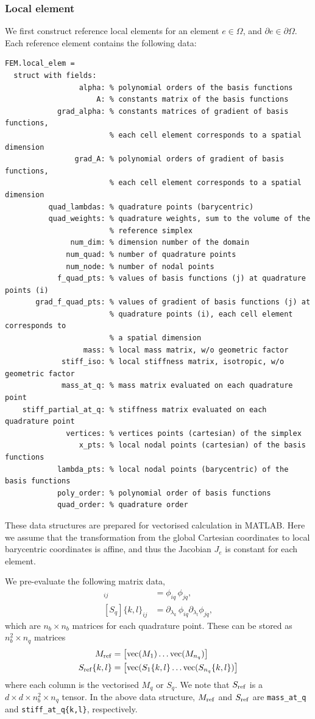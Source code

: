 \documentclass[a4paper,11pt]{scrartcl}
\newcommand{\eqs}[1]{\begin{align} #1 \end{align}}
\begin{document}
\subsubsection*{Local element}
We first construct reference local elements for an element $e \in \Omega$, and $\partial e \in \partial \Omega$. Each reference element contains the following data:
\begin{verbatim}
FEM.local_elem =
  struct with fields:
                 alpha: % polynomial orders of the basis functions
                     A: % constants matrix of the basis functions
            grad_alpha: % constants matrices of gradient of basis functions,
                        % each cell element corresponds to a spatial dimension
                grad_A: % polynomial orders of gradient of basis functions,
                        % each cell element corresponds to a spatial dimension
          quad_lambdas: % quadrature points (barycentric)
          quad_weights: % quadrature weights, sum to the volume of the
                        % reference simplex
               num_dim: % dimension number of the domain
              num_quad: % number of quadrature points
              num_node: % number of nodal points
            f_quad_pts: % values of basis functions (j) at quadrature points (i)
       grad_f_quad_pts: % values of gradient of basis functions (j) at
                        % quadrature points (i), each cell element corresponds to
                        % a spatial dimension
                  mass: % local mass matrix, w/o geometric factor
             stiff_iso: % local stiffness matrix, isotropic, w/o geometric factor
             mass_at_q: % mass matrix evaluated on each quadrature point
    stiff_partial_at_q: % stiffness matrix evaluated on each quadrature point
              vertices: % vertices points (cartesian) of the simplex
                 x_pts: % local nodal points (cartesian) of the basis functions
            lambda_pts: % local nodal points (barycentric) of the basis functions
            poly_order: % polynomial order of basis functions
            quad_order: % quadrature order
\end{verbatim}

These data structures are prepared for vectorised calculation in MATLAB. Here we assume that the transformation from the global Cartesian coordinates to local barycentric coordinates is affine, and thus the Jacobian $J_e$ is constant for each element.

We pre-evaluate the following matrix data,
\eqs{
[M_q]_{ij} & = \phi_{iq} \, \phi_{jq} , \\
[S_q]\{k,l\}_{ij} & = \partial_{\lambda_k} \, \phi_{iq} \partial_{\lambda_l}  \phi_{jq} ,
}
which are $n_b \times n_b$ matrices for each quadrature point. These can be stored as $n_b^2 \times n_q^{}$ matrices
\eqs{
M_{\rm ref} & = \left[ {\rm vec}(M_1) \ldots {\rm vec}(M_{n_q}) \right] \\
S_{\rm ref}\{k,l\} & = \left[ {\rm vec}({S_1}\{k,l\} \ldots {\rm vec}({S_{n_q}}\{k,l\}) \right]
}
where each column is the vectorised $M_q$ or $S_q$. We note that $S_{\rm ref}$ is a $d\times d \times n_b^2 \times n_q^{}$ tensor.
%
In the above data structure, $M_{\rm ref}$ and $S_{\rm ref}$ are \verb|mass_at_q| and \verb|stiff_at_q{k,l}|, respectively.
\end{document}
